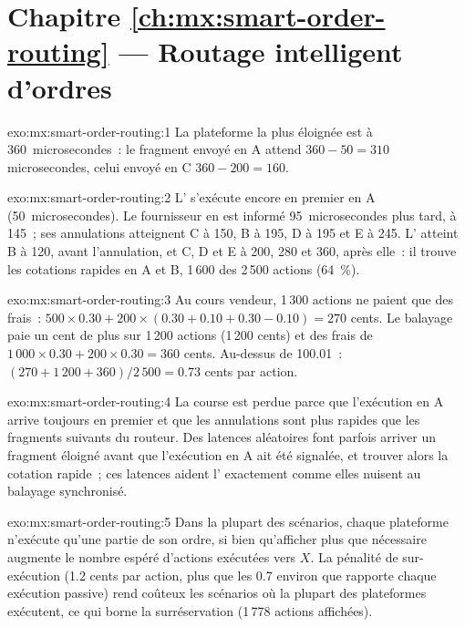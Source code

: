 \section*{Chapitre \ref{ch:mx:smart-order-routing} --- Routage intelligent d'ordres}

\begin{solution}{exo:mx:smart-order-routing:1}
La plateforme la plus éloignée est à 360~microsecondes~: le fragment envoyé en A attend $360-50=310$ microsecondes, celui envoyé en C $360-200=160$.
\end{solution}

\begin{solution}{exo:mx:smart-order-routing:2}
L' s'exécute encore en premier en A (50~microsecondes). Le fournisseur en est informé 95~microsecondes plus tard, à 145~; ses annulations atteignent C à 150, B à 195, D à
195 et E à 245. L' atteint B à 120, avant l'annulation, et C, D et E à 200, 280 et 360, après elle~: il trouve les cotations rapides en A et B,
1\,600 des 2\,500 actions (64~\%).
\end{solution}

\begin{solution}{exo:mx:smart-order-routing:3}
Au cours vendeur, 1\,300 actions ne paient que des frais~: $500\times0.30+200\times(0.30+0.10+0.30-0.10)=270$ cents. Le balayage paie un cent de plus sur 1\,200 actions
(1\,200 cents) et des frais de $1\,000\times0.30+200\times0.30=360$ cents. Au-dessus de 100.01~: $(270+1\,200+360)/2\,500=0.73$
cents par action.
\end{solution}

\begin{solution}{exo:mx:smart-order-routing:4}
La course est perdue parce que l'exécution en A arrive toujours en premier et que les annulations sont plus rapides que les fragments suivants du routeur. Des latences aléatoires font parfois
arriver un fragment éloigné avant que l'exécution en A ait été signalée, et trouver alors la cotation rapide~; ces latences aident l' exactement comme elles nuisent au balayage synchronisé.
\end{solution}

\begin{solution}{exo:mx:smart-order-routing:5}
Dans la plupart des scénarios, chaque plateforme n'exécute qu'une partie de son ordre, si bien qu'afficher plus que nécessaire augmente le nombre espéré d'actions exécutées vers $X$. La pénalité de
sur-exécution (1.2 cents par action, plus que les 0.7 environ que rapporte chaque exécution passive) rend coûteux les scénarios où la plupart des plateformes exécutent, ce qui borne la
surréservation (1\,778 actions affichées).
\end{solution}

